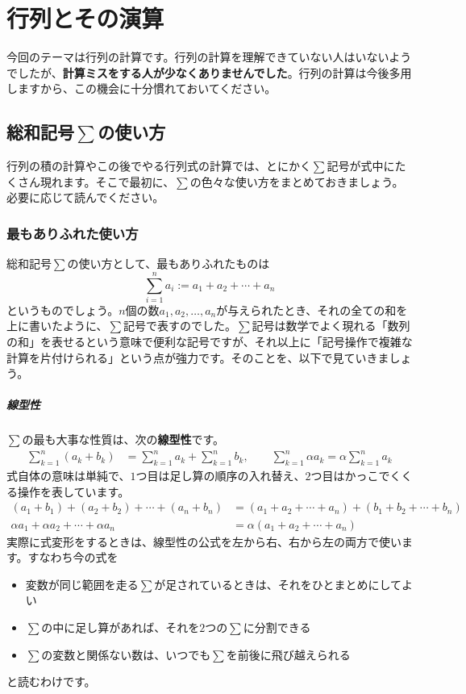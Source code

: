 \chapter{行列とその演算}


今回のテーマは行列の計算です。行列の計算を理解できていない人はいないようでしたが、\textbf{計算ミスをする人が少なくありませんでした}。行列の計算は今後多用しますから、この機会に十分慣れておいてください。

\section[総和記号Σの使い方]{総和記号$\sum$の使い方} \label{section:usage_of_sum_symbol}

行列の積の計算やこの後でやる行列式の計算では、とにかく$\sum$記号が式中にたくさん現れます。そこで最初に、$\sum$の色々な使い方をまとめておきましょう。必要に応じて読んでください。

\subsection{最もありふれた使い方}

総和記号$\sum$の使い方として、最もありふれたものは
\[
\sum_{i = 1}^n a_i := a_1 + a_2  + \cdots + a_n
\]
というものでしょう。$n$個の数$a_1,a_2,\ldots,a_n$が与えられたとき、それの全ての和を上に書いたように、$\sum$記号で表すのでした。$\sum$記号は数学でよく現れる「数列の和」を表せるという意味で便利な記号ですが、それ以上に「記号操作で複雑な計算を片付けられる」という点が強力です。そのことを、以下で見ていきましょう。

\paragraph{線型性}
$\sum$の最も大事な性質は、次の\textbf{線型性}です。
\begin{align*}
\sum_{k = 1}^n  (a_k + b_k) &= \sum_{k = 1}^n a_k + \sum_{k = 1}^n b_k, \qquad
\sum_{k = 1}^n \alpha a_k = \alpha \sum_{k = 1}^n a_k
\end{align*}
式自体の意味は単純で、$1$つ目は足し算の順序の入れ替え、$2$つ目はかっこでくくる操作を表しています。
\begin{align*}
(a_1 + b_1) + (a_2 + b_2) + \cdots + (a_n + b_n) &= (a_1 + a_ 2 + \cdots + a_n) + (b_1 + b_2 + \cdots + b_n) \\
\alpha a_1 + \alpha a_2 + \cdots + \alpha a_n &= \alpha (a_1 + a_2 + \cdots + a_n)
\end{align*}
実際に式変形をするときは、線型性の公式を左から右、右から左の両方で使います。すなわち今の式を
\begin{itemize}
\item 変数が同じ範囲を走る$\sum$が足されているときは、それをひとまとめにしてよい
\item $\sum$の中に足し算があれば、それを$2$つの$\sum$に分割できる
\item $\sum$の変数と関係ない数は、いつでも$\sum$を前後に飛び越えられる
\end{itemize}
と読むわけです。

